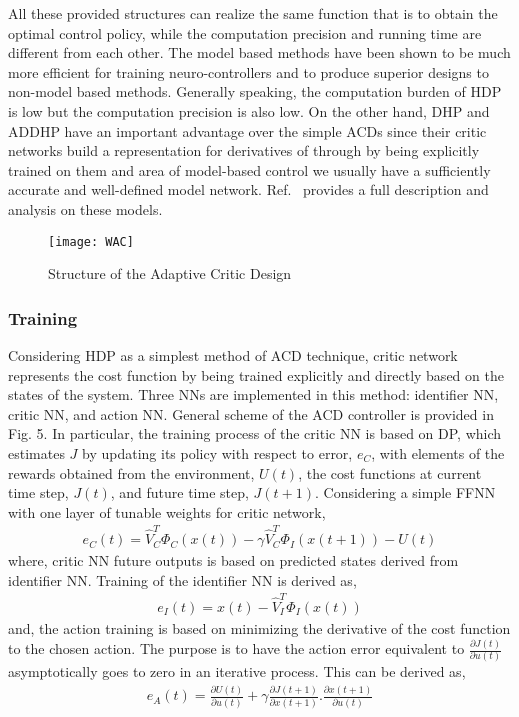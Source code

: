 \documentclass[journal]{IEEEtran}
\begin{document}
All these provided structures can realize the same function that is to obtain the optimal control policy, while the computation precision and running time are different from each other. The model based methods have been shown to be much more efficient for training neuro-controllers and to produce superior designs to non-model based methods. Generally speaking, the computation burden of HDP is low but the computation precision is also low. On the other hand, DHP and ADDHP have an important advantage over the simple ACDs since their critic networks build a representation for derivatives of through by being explicitly trained on them and area of model-based control we usually have a sufficiently accurate and well-defined model network. Ref.~\cite{BlueBook} provides a full description and analysis on these models.

\begin{figure}
\centering
\texttt{[image: WAC]}
\caption{Structure of the Adaptive Critic Design}
\label{fig:ContVP}
\end{figure}





\subsubsection{Training}
Considering HDP as a simplest method of ACD technique, critic network represents the cost function by being trained explicitly and directly based on the states of the system. Three NNs are implemented in this method: identifier NN, critic NN, and action NN. General scheme of the ACD controller is provided in Fig. 5. In particular, the training process of the critic NN is based on DP, which estimates $J$ by updating its policy with respect to error, $e_C$, with elements of the rewards obtained from the environment, $U(t)$, the cost functions at current time step, $J(t)$, and future time step, $J(t+1)$. Considering a simple FFNN with one layer of tunable weights for critic network,
\begin{eqnarray}
e_C(t)= \hat{V}_{C}^T\Phi_{C}(x(t)) - \gamma \hat{V}_{C}^T\Phi_{I}(x(t+1))-U(t)
\label{ec}
\end{eqnarray}
where, critic NN future outputs is based on predicted states derived from identifier NN. Training of the identifier NN is derived as,
\begin{eqnarray}
e_{I}(t)=x(t)-\hat{V}_{I}^T\Phi_{I}(x(t))
\end{eqnarray}
and, the action training is based on minimizing the derivative of the cost function to the chosen action. The purpose is to have the action error equivalent to $\frac{\partial J(t)}{\partial u(t)}$ asymptotically goes to zero in an iterative process. This can be derived as,
\begin{eqnarray}
e_{A}(t)=\frac{\partial U(t)}{\partial u(t)}+\gamma \frac{\partial J(t+1)}{\partial x(t+1)}.\frac{\partial x(t+1)}{\partial u(t)}
\label{ea}
\end{eqnarray}
\end{document}

